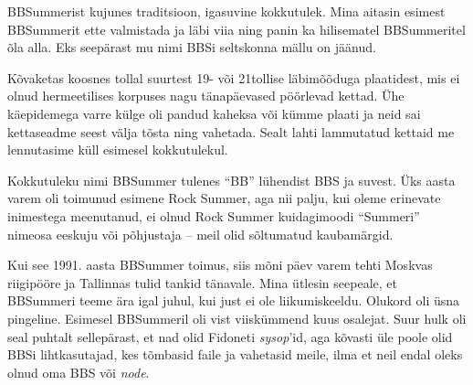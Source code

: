 BBSummerist kujunes traditsioon, igasuvine kokkutulek. Mina aitasin 
esimest BBSummerit ette valmistada ja läbi viia ning panin ka hilisematel BBSummeritel õla alla.
Eks seepärast mu nimi BBSi seltskonna mällu on jäänud.


Kõvaketas koosnes tollal suurtest 19- või 21tollise 
läbimõõduga plaatidest, mis ei olnud 
hermeetilises korpuses nagu tänapäevased pöörlevad kettad. 
Ühe käepidemega varre külge oli pandud kaheksa või kümme plaati ja neid sai 
kettaseadme seest välja tõsta ning vahetada. Sealt lahti lammutatud kettaid me lennutasime küll esimesel 
kokkutulekul. 

Kokkutuleku nimi BBSummer tulenes 
\enquote{BB} lühendist BBS ja suvest. Üks aasta varem 
oli toimunud esimene Rock Summer, aga nii palju, kui oleme erinevate inimestega 
meenutanud, ei olnud Rock Summer kuidagimoodi \enquote{Summeri} nimeosa 
eeskuju või põhjustaja – meil olid sõltumatud kaubamärgid. 

Kui see 1991. aasta BBSummer toimus, 
siis mõni päev varem tehti
Moskvas riigipööre ja Tallinnas tulid tankid tänavale. Mina ütlesin seepeale, et BBSummeri teeme ära igal juhul, kui just ei ole 
liikumiskeeldu. Olukord oli üsna pingeline. Esimesel BBSummeril 
oli vist viiskümmend kuus osalejat. Suur hulk oli seal puhtalt sellepärast, et nad olid Fidoneti 
\emph{sysop}'id, aga kõvasti üle poole 
olid BBSi lihtkasutajad, kes tõmbasid faile ja 
vahetasid meile, ilma et neil endal oleks olnud oma BBS või \emph{node}.

